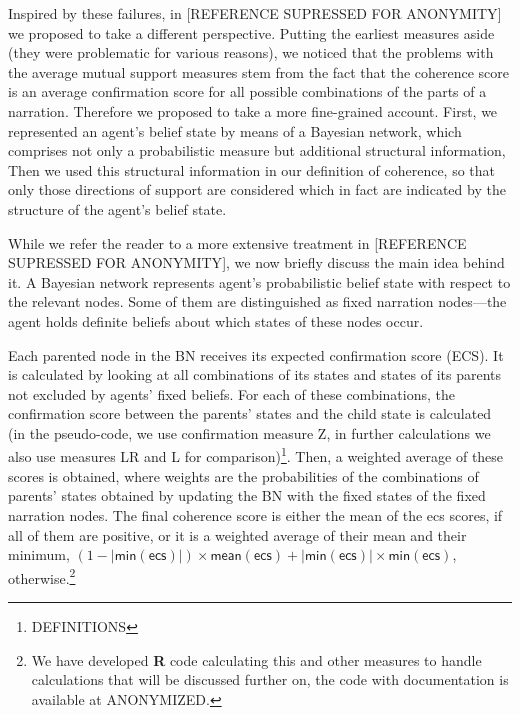\documentclass[
  10pt,
]{scrartcl}
\newcommand{\s}[1]{\textsf{#1}}
\begin{document}
Inspired by these failures, in {[}REFERENCE SUPRESSED FOR ANONYMITY{]} we proposed to take a different perspective. Putting the earliest measures aside (they were problematic for various reasons), we noticed that the problems with the average mutual support measures stem from the fact that the coherence score is an average confirmation score for all possible combinations of the parts of a narration. Therefore we proposed to take a more fine-grained account. First, we represented an agent's belief state by means of a Bayesian network, which comprises not only a probabilistic measure but additional structural information, Then we used this structural information in our definition of coherence, so that only those directions of support are considered which in fact are indicated by the structure of the agent's belief state.

While we refer the reader to a more extensive treatment in {[}REFERENCE SUPRESSED FOR ANONYMITY{]}, we now briefly discuss the main idea behind it. A Bayesian network represents agent's probabilistic belief state with respect to the relevant nodes. Some of them are distinguished as fixed narration nodes---the agent holds definite beliefs about which states of these nodes occur.

Each parented node in the BN receives its expected confirmation score (\s{ECS}). It is calculated by looking at all combinations of its states and states of its parents not excluded by agents' fixed beliefs. For each of these combinations, the confirmation score between the parents' states and the child state is calculated (in the pseudo-code, we use confirmation measure \s{Z}, in further calculations we also use measures \s{LR} and \s{L} for comparison)\footnote{DEFINITIONS}. Then, a weighted average of these scores is obtained, where weights are the probabilities of the combinations of parents' states obtained by updating the BN with the fixed states of the fixed narration nodes. The final coherence score is either the mean of the \s{ecs} scores, if all of them are positive, or it is a weighted average of their mean and their minimum, \((1- |\s{min}(\s{ecs})|) \times \s{mean}(\s{ecs}) + |\s{min}(\s{ecs})| \times \s{min}(\s{ecs})\), otherwise.\footnote{We have developed \textbf{\textsf{R}} code calculating this and other measures to handle calculations that will be discussed further on, the code with documentation is available at ANONYMIZED.}

\pagebreak 
\footnotesize
\end{document}
